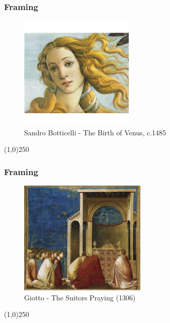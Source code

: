 \begin{frame}
\frametitle{Framing}
\begin{figure}
	\centering
	\includegraphics[height=5.5cm]{img/CandC/BirthofVenusCrop.jpg}
	\caption[Sandro Botticelli - The Birth of Venus, c.1485]{Sandro Botticelli - The Birth of Venus, c.1485}
	\label{fig:sandrobotticelliVenusCrop}
\end{figure}
\end{frame}
\begin{center}\line(1,0){250}\end{center}



\begin{frame}
\frametitle{Framing}
\begin{figure}
	\centering
	\includegraphics[height=5.5cm]{img/CandC/the-suitors-praying}
	\caption{Giotto - The Suitors Praying (1306)}
	\label{fig:the-suitors-praying}
\end{figure}
\end{frame}
\begin{center}\line(1,0){250}\end{center}



